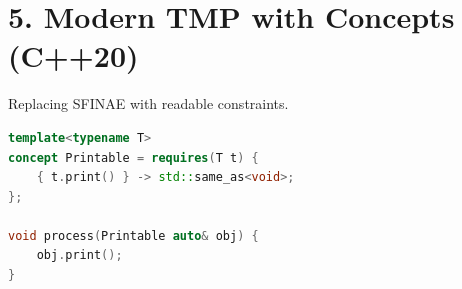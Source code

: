 \hypertarget{modern-tmp-with-concepts-c20}{%
\section{5. Modern TMP with Concepts
(C++20)}\label{modern-tmp-with-concepts-c20}}

Replacing SFINAE with readable constraints.

\begin{lstlisting}[language={C++}]
template<typename T>
concept Printable = requires(T t) {
    { t.print() } -> std::same_as<void>;
};

void process(Printable auto& obj) {
    obj.print();
}
\end{lstlisting}
